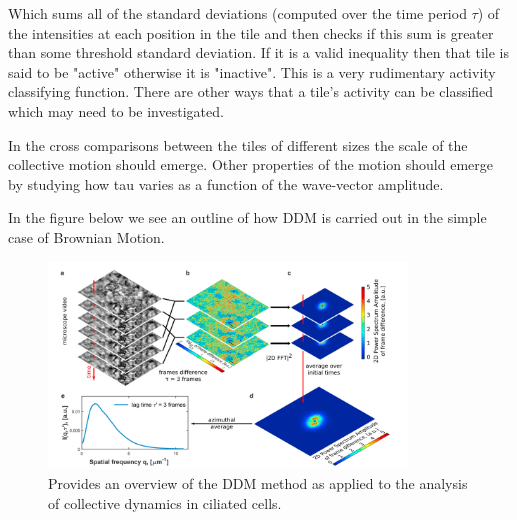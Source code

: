 \documentclass[11pt]{article}
\begin{document}
Which sums all of the standard deviations (computed over the time period $\tau$) of the intensities at each position in the tile and then checks if this sum is greater than some threshold standard deviation.
If it is a valid inequality then that tile is said to be "active" otherwise it is "inactive".\cite{ddm2}
This is a very rudimentary activity classifying function.
There are other ways that a tile's activity can be classified which may need to be investigated.

In the cross comparisons between the tiles of different sizes the scale of the collective motion should emerge.\cite{ddm1}
Other properties of the motion should emerge by studying how tau varies as a function of the wave-vector amplitude.\cite{ddm1}

In the figure below we see an outline of how DDM is carried out in the simple case of Brownian Motion.

\begin{figure}[H]
\centering
\includegraphics[height=5.5cm]{images/ddmpic.png}
\caption{Provides an overview of the DDM method as applied to the analysis of collective dynamics in ciliated cells.\cite{ddm2}}
\end{figure}
\end{document}
